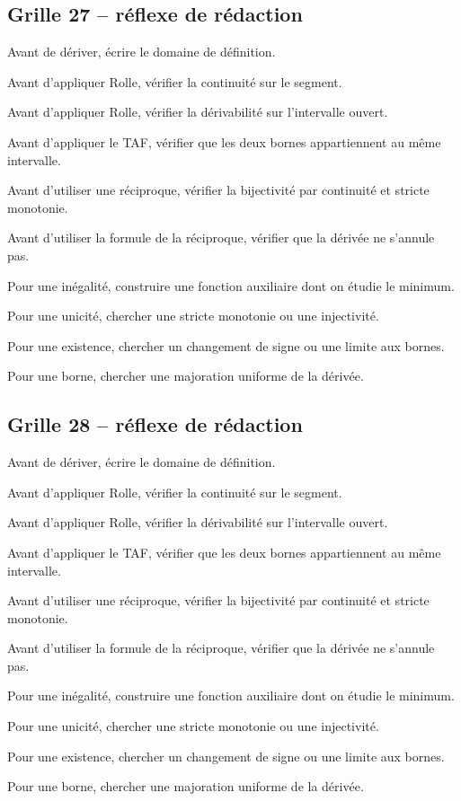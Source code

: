\documentclass[11pt,a4paper]{article}
\begin{document}
\subsection*{Grille 27 -- réflexe de rédaction}

\begin{methodebox}

Avant de dériver, écrire le domaine de définition.

Avant d'appliquer Rolle, vérifier la continuité sur le segment.

Avant d'appliquer Rolle, vérifier la dérivabilité sur l'intervalle ouvert.

Avant d'appliquer le TAF, vérifier que les deux bornes appartiennent au même intervalle.

Avant d'utiliser une réciproque, vérifier la bijectivité par continuité et stricte monotonie.

Avant d'utiliser la formule de la réciproque, vérifier que la dérivée ne s'annule pas.

Pour une inégalité, construire une fonction auxiliaire dont on étudie le minimum.

Pour une unicité, chercher une stricte monotonie ou une injectivité.

Pour une existence, chercher un changement de signe ou une limite aux bornes.

Pour une borne, chercher une majoration uniforme de la dérivée.

\end{methodebox}

\subsection*{Grille 28 -- réflexe de rédaction}

\begin{methodebox}

Avant de dériver, écrire le domaine de définition.

Avant d'appliquer Rolle, vérifier la continuité sur le segment.

Avant d'appliquer Rolle, vérifier la dérivabilité sur l'intervalle ouvert.

Avant d'appliquer le TAF, vérifier que les deux bornes appartiennent au même intervalle.

Avant d'utiliser une réciproque, vérifier la bijectivité par continuité et stricte monotonie.

Avant d'utiliser la formule de la réciproque, vérifier que la dérivée ne s'annule pas.

Pour une inégalité, construire une fonction auxiliaire dont on étudie le minimum.

Pour une unicité, chercher une stricte monotonie ou une injectivité.

Pour une existence, chercher un changement de signe ou une limite aux bornes.

Pour une borne, chercher une majoration uniforme de la dérivée.

\end{methodebox}
\end{document}
